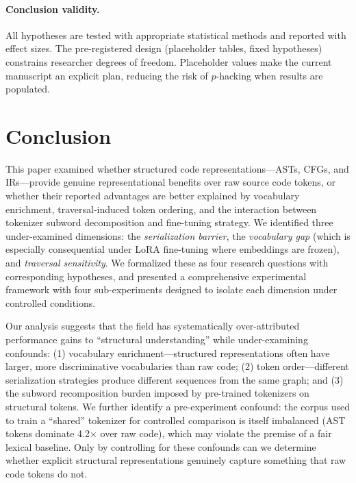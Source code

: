 \documentclass[pdflatex,sn-mathphys,Numbered]{sn-jnl}
\begin{document}
\paragraph{Conclusion validity.} All hypotheses are tested with appropriate statistical methods and reported with effect sizes. The pre-registered design (placeholder tables, fixed hypotheses) constrains researcher degrees of freedom. Placeholder values make the current manuscript an explicit plan, reducing the risk of $p$-hacking when results are populated.

\section{Conclusion}\label{sec:conclusion}

This paper examined whether structured code representations---ASTs, CFGs, and IRs---provide genuine representational benefits over raw source code tokens, or whether their reported advantages are better explained by vocabulary enrichment, traversal-induced token ordering, and the interaction between tokenizer subword decomposition and fine-tuning strategy. We identified three under-examined dimensions: the \emph{serialization barrier}, the \emph{vocabulary gap} (which is especially consequential under LoRA fine-tuning where embeddings are frozen), and \emph{traversal sensitivity}. We formalized these as four research questions with corresponding hypotheses, and presented a comprehensive experimental framework with four sub-experiments designed to isolate each dimension under controlled conditions.

Our analysis suggests that the field has systematically over-attributed performance gains to ``structural understanding'' while under-examining confounds: (1) vocabulary enrichment---structured representations often have larger, more discriminative vocabularies than raw code; (2) token order---different serialization strategies produce different sequences from the same graph; and (3) the subword recomposition burden imposed by pre-trained tokenizers on structural tokens. We further identify a pre-experiment confound: the corpus used to train a ``shared'' tokenizer for controlled comparison is itself imbalanced (AST tokens dominate 4.2$\times$ over raw code), which may violate the premise of a fair lexical baseline. Only by controlling for these confounds can we determine whether explicit structural representations genuinely capture something that raw code tokens do not.
\end{document}
